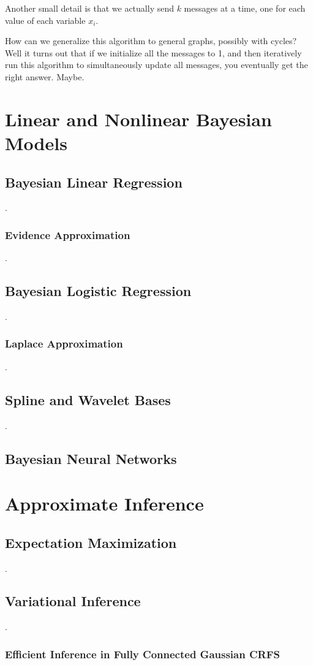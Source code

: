 \documentclass[12pt]{article}
\begin{document}
Another small detail is that we actually send $k$ messages at a time, one for each value of each variable $x_i$. 

How can we generalize this algorithm to general graphs, possibly with cycles? Well it turns out that if we initialize all the messages to 1, and then iteratively run this algorithm to simultaneously update all messages, you eventually get the right answer. Maybe. 

\section{Linear and Nonlinear Bayesian Models}

\subsection{Bayesian Linear Regression}
.
\subsubsection{Evidence Approximation}
.
\subsection{Bayesian Logistic Regression}
.
\subsubsection{Laplace Approximation}
.
\subsection{Spline and Wavelet Bases}
.
\subsection{Bayesian Neural Networks}

\section{Approximate Inference}

\subsection{Expectation Maximization}
.
\subsection{Variational Inference}
.
\subsubsection{Efficient Inference in Fully Connected Gaussian CRFS}
\end{document}
